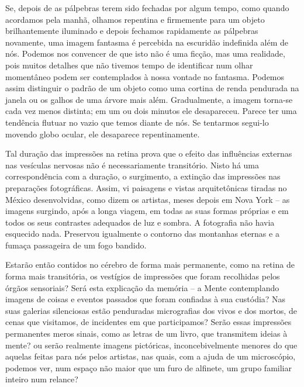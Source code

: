 \documentclass[11pt,a5paper,twoside,openany]{book}
\begin{document}
Se, depois de as pálpebras terem sido fechadas por algum tempo, como quando acordamos pela manhã, olhamos repentina e firmemente para um objeto brilhantemente iluminado e depois fechamos rapidamente as pálpebras novamente, uma imagem fantasma é percebida na escuridão indefinida além de nós. Podemos nos convencer de que isto não é uma ficção, mas uma realidade, pois muitos detalhes que não tivemos tempo de identificar num olhar momentâneo podem ser contemplados à nossa vontade no fantasma. Podemos assim distinguir o padrão de um objeto como uma cortina de renda pendurada na janela ou os galhos de uma árvore mais além. Gradualmente, a imagem torna-se cada vez menos distinta; em um ou dois minutos ele desapareceu. Parece ter uma tendência flutuar no vazio que temos diante de nós. Se tentarmos segui-lo movendo globo ocular, ele desaparece repentinamente.

Tal duração das impressões na retina prova que o efeito das influências externas nas vesículas nervosas não é necessariamente transitório. Nisto há uma correspondência com a duração, o surgimento, a extinção das impressões nas preparações fotográficas. Assim, vi paisagens e vistas arquitetônicas tiradas no México desenvolvidas, como dizem os artistas, meses depois em Nova York – as imagens surgindo, após a longa viagem, em todas as suas formas próprias e em todos os seus contrastes adequados de luz e sombra. A fotografia não havia esquecido nada. Preservou igualmente o contorno das montanhas eternas e a fumaça passageira de um fogo bandido.

Estarão então contidos no cérebro de forma mais permanente, como na retina de forma mais transitória, os vestígios de impressões que foram recolhidas pelos órgãos sensoriais? Será esta explicação da memória – a Mente contemplando imagens de coisas e eventos passados ​​que foram confiadas à sua custódia? Nas suas galerias silenciosas estão penduradas micrografias dos vivos e dos mortos, de cenas que visitamos, de incidentes em que participamos? Serão essas impressões permanentes meros sinais, como as letras de um livro, que transmitem ideias à mente? ou serão realmente imagens pictóricas, inconcebivelmente menores do que aquelas feitas para nós pelos artistas, nas quais, com a ajuda de um microscópio, podemos ver, num espaço não maior que um furo de alfinete, um grupo familiar inteiro num relance?
\end{document}
